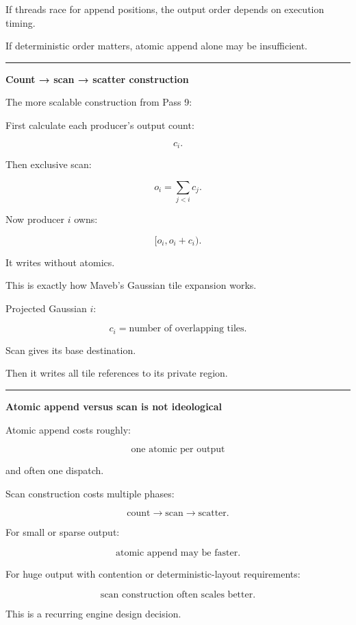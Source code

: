 If threads race for append positions, the output order depends on execution timing.

If deterministic order matters, atomic append alone may be insufficient.

\begin{center}\rule{0.5\linewidth}{0.5pt}\end{center}

\textbf{Count → scan → scatter construction}

The more scalable construction from Pass 9:

First calculate each producer's output count:

\[
c_i.
\]

Then exclusive scan:

\[
o_i=
\sum_{j<i}c_j.
\]

Now producer \(i\) owns:

\[
[o_i,o_i+c_i).
\]

It writes without atomics.

This is exactly how Maveb's Gaussian tile expansion works.

Projected Gaussian \(i\):

\[
c_i=
\text{number of overlapping tiles}.
\]

Scan gives its base destination.

Then it writes all tile references to its private region.

\begin{center}\rule{0.5\linewidth}{0.5pt}\end{center}

\textbf{Atomic append versus scan is not ideological}

Atomic append costs roughly:

\[
\text{one atomic per output}
\]

and often one dispatch.

Scan construction costs multiple phases:

\[
\text{count}
\rightarrow
\text{scan}
\rightarrow
\text{scatter}.
\]

For small or sparse output:

\[
\boxed{
\text{atomic append may be faster}.
}
\]

For huge output with contention or deterministic-layout requirements:

\[
\boxed{
\text{scan construction often scales better}.
}
\]

This is a recurring engine design decision.

